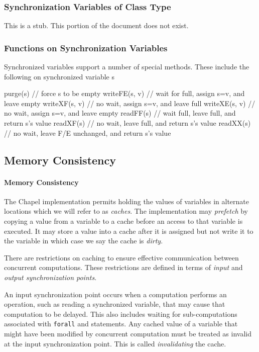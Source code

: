 \subsubsection{Synchronization Variables of Class Type}
\label{Synchronization_Variables_of_Class_Type}

This is a stub.  This portion of the document does not exist.

\subsubsection{Functions on Synchronization Variables}
\label{Functions_on_Synchronization_Variables}

Synchronized variables support a number of special methods. These
include the following on synchronized variable s
\begin{chapel}
purge(s)      // force s to be empty
writeFE(s, v) // wait for full, assign s=v, and leave empty
writeXF(s, v) // no wait, assign s=v, and leave full
writeXE(s, v) // no wait, assign s=v, and leave empty
readFF(s)     // wait full, leave full, and return s's value
readXF(s)     // no wait, leave full, and return s's value
readXX(s)     // no wait, leave F/E unchanged, and return s's value
\end{chapel}

\subsection{Memory Consistency}
\label{Memory_Consistency}

\paragraph{Memory Consistency}
The Chapel implementation permits holding the values of variables in
alternate locations which we will refer to as {\em caches}.  The
implementation may {\em prefetch} by copying a value from a variable
to a cache before an access to that variable is executed. It may store
a value into a cache after it is assigned but not write it to the
variable in which case we say the cache is {\em dirty}.
 
There are restrictions on caching to ensure effective communication
between concurrent computations. These restrictions are defined in
terms of {\em input} and {\em output synchronization points}.

An input synchronization point occurs when a computation performs an
operation, such as reading a synchronized variable, that may cause
that computation to be delayed. This also includes waiting for
sub-computations associated with {\tt forall} and 
statements. Any cached value of a variable that might have been
modified by concurrent computation must be treated as invalid at the
input synchronization point.  This is called {\em invalidating} the
cache.

